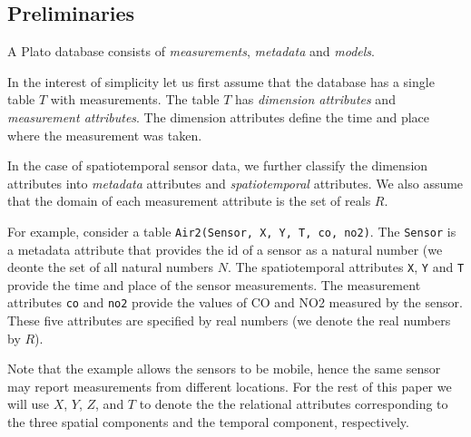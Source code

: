 \subsection{Preliminaries}
\label{sec:prelims}

A Plato database consists of {\em measurements}, {\em metadata} and {\em models}.

 In the interest of
simplicity let us first assume that the database has a single table
$T$ with measurements. The table $T$ has {\em dimension attributes}
and {\em measurement attributes}. The dimension attributes define the
time and place where the measurement was taken.

In the case of spatiotemporal sensor data, we further classify the
dimension attributes into {\em metadata} attributes and {\em
  spatiotemporal} attributes. We also assume that the domain of each
measurement attribute is the set of reals $R$.

For example, consider a table \texttt{Air2(Sensor, X, Y, T, co,
  no2)}. The \texttt{Sensor} is a metadata attribute that provides the
id of a sensor as a natural number (we deonte the set of all natural
numbers $N$. The spatiotemporal attributes \texttt{X}, \texttt{Y}
and \texttt{T} provide the time and place of the sensor
measurements. The measurement attributes \texttt{co} and \texttt{no2}
provide the values of CO and NO2 measured by the sensor. These five
attributes are specified by real numbers (we denote the real numbers
by $R$).

Note that the example allows the sensors to be mobile, hence the
same sensor may report measurements from different locations. For the
rest of this paper we will use $X$, $Y$, $Z$, and $T$ to denote the 
the relational attributes corresponding to the three spatial
components and the temporal component, respectively.


